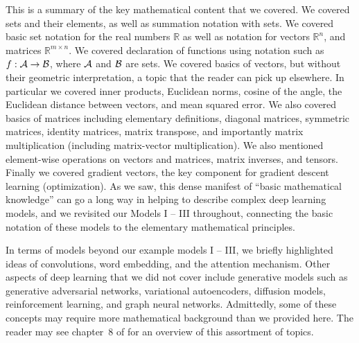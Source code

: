 \documentclass[12pt]{article}
\begin{document}

This is a summary of the key mathematical content that we covered. We covered sets and their elements, as well as summation notation with sets. We covered basic set notation for the real numbers ${\mathbb R}$ as well as notation for vectors ${\mathbb R}^n$, and matrices ${\mathbb R}^{m \times n}$. We covered declaration of functions using notation such as $f: {\cal A} \to {\cal B}$, where ${\cal A}$ and ${\cal B}$ are sets. We covered basics of vectors, but without their geometric interpretation, a topic that the reader can pick up elsewhere. In particular we covered inner products, Euclidean norms, cosine of the angle, the Euclidean distance between vectors, and mean squared error. We also covered basics of matrices including elementary definitions, diagonal matrices, symmetric matrices, identity matrices, matrix transpose, and importantly matrix multiplication (including matrix-vector multiplication). We also mentioned element-wise operations on vectors and matrices, matrix inverses, and tensors. Finally we covered gradient vectors, the key component for gradient descent learning (optimization). As we saw, this dense manifest of ``basic mathematical knowledge'' can go a long way in helping to describe complex deep learning models, and we revisited our Models I -- III throughout, connecting the basic notation of these models to the elementary mathematical principles.

In terms of models beyond our example models I -- III, we briefly highlighted ideas of convolutions, word embedding, and the attention mechanism. Other aspects of deep learning that we did not cover include generative models such as generative adversarial networks, variational autoencoders, diffusion models, reinforcement learning, and graph neural networks. Admittedly, some of these concepts may require more mathematical background than we provided here. The reader may see chapter~8 of \cite{LiquetMokaNazarathy2024DeepLearning} for an overview of this assortment of topics. 


\end{document}
